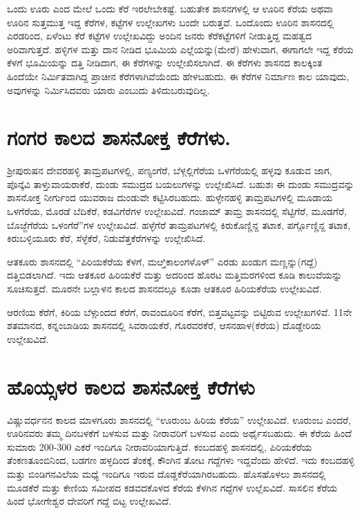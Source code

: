 ಒಂದು ಊರು ಎಂದ ಮೇಲೆ ಒಂದು ಕೆರೆ ಇರಲೇಬೇಕಷ್ಟೆ. ಬಹುತೇಕ ಶಾಸನಗಳಲ್ಲಿ ಆ ಊರಿನ ಕೆರೆಯ ಅಥವಾ ಊರಿನ ಸುತ್ತಮುತ್ತ ಇದ್ದ ಕೆರೆಗಳ, ಕಟ್ಟೆಗಳ ಉಲ್ಲೇಖಗಳು ಬಂದೇ ಬರುತ್ತವೆ. ಒಂದೊಂದು ಊರಿನ ಶಾಸನದಲ್ಲಿ ಎರಡರಿಂದ, ಏಳೆಂಟು ಕೆರೆ ಕಟ್ಟೆಗಳ ಉಲ್ಲೇಖವಿದ್ದು ಅಂದಿನ ಜನರು ಕೆರೆಕಟ್ಟೆಗಳಿಗೆ ನೀಡುತ್ತಿದ್ದ ಮಹತ್ವದ ಅರಿವಾಗುತ್ತದೆ. ಹಳ್ಳಿಗಳ ಮತ್ತು ದಾನ ನೀಡಿದ ಭೂಮಿಯ ಎಲ್ಲೆಯನ್ನು(ಮೇರೆ) ಹೇಳುವಾಗ, ಈಗಾಗಲೇ ಇದ್ದ ಕೆರೆಯ ಕೆಳಗೆ ಭೂಮಿಯನ್ನು ದತ್ತಿ ನೀಡಿದಾಗ, ಈ ಕೆರೆಗಳನ್ನು ಉಲ್ಲೇಖಿಸಲಾಗಿದೆ. ಈ ಕೆರೆಗಳು ಶಾಸನದ ಕಾಲಕ್ಕಿಂತ ಹಿಂದೆಯೇ ನಿರ್ಮಿತವಾಗಿದ್ದ ಪ್ರಾಚೀನ ಕೆರೆಗಳಾಗಿವೆಯೆಂದು ಹೇಳಬಹುದು. ಈ ಕೆರೆಗಳ ನಿರ್ಮಾಣ ಕಾಲ ಯಾವುದು, ಅವುಗಳನ್ನು ನಿರ್ಮಿಸಿದವರು ಯಾರು ಎಂಬುದು ತಿಳಿದುಬರುವುದಿಲ್ಲ.


\section{ಗಂಗರ ಕಾಲದ ಶಾಸನೋಕ್ತ ಕೆರೆಗಳು.}

ಶ‍್ರೀಪುರುಷನ ದೇವರಹಳ್ಳಿ ತಾಮ್ರಪಟಗಳಲ್ಲಿ, ಪಣ್ಯಂಗೆರೆ, ಬೆಳ್ಗಲ್ಲಿಗೆರೆಯ ಒಳಗೆರೆಯಲ್ಲಿ ಹಳ್ಳವು ಕೂಡುವ ಜಾಗ, ಪೊನ್ಕೆವಿ ತಾಳ್ತುವಾಯರಾಕೆರೆ, ದುಂಡು ಸಮುದ್ರದ ಬಯಲುಗಳನ್ನು ಉಲ್ಲೇಖಿಸಿದೆ. ಬಹುಶಃ ಈ ದುಂಡು ಸಮುದ್ರವನ್ನು ಶಾಸನೋಕ್ತ ನೀರ್ಗುಂದ ಯುವರಾಜ ದುಂಡುವೇ ಕಟ್ಟಿಸಿರಬಹುದು. ಹುಳ್ಳೇನಹಳ್ಳಿ ತಾಮ್ರಪಟಗಳಲ್ಲಿ ಮೂಡಾಯ ಒಳಗೆರೆಯ, ಮೊರಡೆ ಬೆದಿಕೆರೆ, ಕಡವಿಗೆರೆಗಳ ಉಲ್ಲೇಖವಿದೆ. ಗಂಜಾಮ್ ತಾಮ್ರ ಶಾಸನದಲ್ಲಿ ಸೆಟ್ಟಿಗೆರೆ, ಮೂಡಗೆರೆ, ಬೊಜ್ಜೆಗೆರೆಯ ಒಳಂಗೆರೆ”ಗಳ ಉಲ್ಲೇಖವಿದೆ. ಹಳ್ಳೆಗೆರೆ ತಾಮ್ರಪಟಗಳಲ್ಲಿ ಕಿರುಕೊಣ್ಣಿನ್ದ ತಟಾಕ, ಪರ್ಗ್ಗೊಣ್ಣಿನ್ದ ತಟಾಕ, ಕಿರುಬಳ್ಳಿಯೂರು ಕೆರೆ, ಸೆಳ್ಳೆಕೆರೆ, ನಿಡುವೆತ್ತಕೆರೆಗಳನ್ನು ಉಲ್ಲೇಖಿಸಿದೆ.

ಆತಕೂರು ಶಾಸನದಲ್ಲಿ “ಪಿರಿಯಕೆರೆಯ ಕೆಳಗೆ, ಮೞ್ತಿಕಾಲಂಗಳೊಳ್​” ಎರಡು ಖಂಡುಗ ಮಣ್ಣನ್ನು(ಗದ್ದೆ) ದತ್ತಿಬಿಡಲಾಗಿದೆ. ಇದು ಆತಕೂರ ಹಿರಿಯಕೆರೆ ಮತ್ತು ಅದರಿಂದ ಹೊರಟ ಮತ್ತಿಮರಗಳಿಂದ ಕೂಡಿ ಕಾಲುವೆಯನ್ನು ಸೂಚಿಸುತ್ತದೆ. ಮೂರನೇ ಬಲ್ಲಾಳನ ಕಾಲದ ಶಾಸನದಲ್ಲೂ ಕೂಡಾ ಆತಕೂರ ಹಿರಿಯಕೆರೆಯ ಉಲ್ಲೇಖವಿದೆ.

ಆರಣಿಯ ಕೆರೆಗೆ, ಕಿರಿಯ ಬೆಳ್ಗುಂದದ ಕೆರೆಗೆ, ರಾವಂದೂರಿನ ಕೆರೆಗೆ, ಬಿತ್ತವಟ್ಟವನ್ನು ಬಿಟ್ಟಿರುವ ಉಲ್ಲೇಖಗಳಿವೆ. 11ನೇ ಶತಮಾನದ, ಕನ್ನಂಬಾಡಿಯ ಶಾಸನದಲ್ಲಿ ಸಿವರಾಯಕೆರೆ, ಗೊರವರಕೆರೆ, ಆಸನಹಾಳ(ಕೆರೆಯ) ದೊಡ್ಡೇರಿಯ ಉಲ್ಲೇಖವಿದೆ.


\section{ಹೊಯ್ಸಳರ ಕಾಲದ ಶಾಸನೋಕ್ತ ಕೆರೆಗಳು}

ವಿಷ್ಣುವರ್ಧನನ ಕಾಲದ ಮಾಳಗೂರು ಶಾಸನದಲ್ಲಿ “ಊರುಂಬ ಹಿರಿಯ ಕೆರೆಯ” ಉಲ್ಲೇಖವಿದೆ. ಊರುಂಬ ಎಂದರೆ, ಊರಿನವರು ತಮ್ಮ ದಿನಬಳಕೆಗೆ ಬಳಸುವ ಮತ್ತು ನೀರಾವರಿಗೆ ಬಳಸುವ ಎಂದು ಅರ್ಥೈಸಬಹುದು. ಈ ಕೆರೆಯ ಹಿಂದೆ ಸುಮಾರು 200-300 ಎಕರೆ ಇಂದಿಗೂ ನೀರಾವರಿಯಾಗುತ್ತಿದೆ. ಕಂಬದಹಳ್ಳಿ ಶಾಸನದಲ್ಲಿ, ಪಿರಿಯಕೆರೆಯ ತೆಂಕಣತೂಂಬಿನಿಂದ, ಬಡಗಣ ಹಳ್ಳದಿಂದ ತೆಂಕಕ್ಕೆ, ಕೌಂಗಿನ ತೋಟ ಗದ್ದೆಗಳು ಇದ್ದವೆಂದು ಹೇಳಿದೆ. ಇದು ಕಂಬದಹಳ್ಳಿ ಮತ್ತು ಬಿಂಡಿಗನವಿಲೆಯ ಮಧ್ಯೆ ಇಂದಿಗೂ ಇರುವ ದೊಡ್ಡಕೆರೆಯಾಗಿರಬಹುದು. ಹೊಸಹೊಳಲು ಶಾಸನದಲ್ಲಿ ಮೂಡಕೆರೆ ಮತ್ತು ಕೇಣಿಯ ಸಮೀಪದ ಕಡವದಕೊಳದ ಕೆರೆಯ ಕೆಳಗಿನ ಗದ್ದೆಗಳ ಉಲ್ಲೆಖವಿದೆ. ಸಾಸಲಿನ ಕೆರೆಯ ಹಿಂದೆ ಭೋಗೇಶ್ವರ ದೇವರಿಗೆ ಗದ್ದೆ ಬಿಟ್ಟ ಉಲ್ಲೇಖವಿದೆ.

